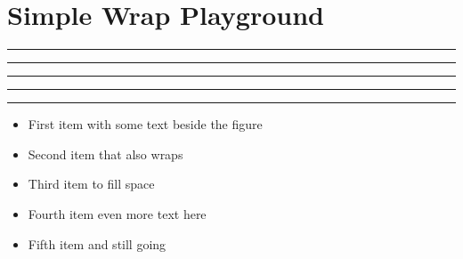 \documentclass[11pt,a4paper]{article}
\begin{document}
\section*{Simple Wrap Playground}

\begin{simplewrap}
  \textcolor{red!30}{\rule{4cm}{5cm}}
\end{simplewrap}
\lipsum[1]\lipsum[2]\lipsum[3]

\vspace{2cm}

\begin{simplewrap}
  \textcolor{blue!20}{\rule{3cm}{9cm}}
\end{simplewrap}
\lipsum[4]\lipsum[5]\lipsum[6]\lipsum[7]\lipsum[8]

\vspace{2cm}

\begin{simplewrap}
  \textcolor{green!30}{\rule{6cm}{3cm}}
\end{simplewrap}
\lipsum[9]\lipsum[10]

\vspace{2cm}

\lipsum[11]
\begin{simplewrap}
  \textcolor{orange!30}{\rule{4cm}{5cm}}
\end{simplewrap}
\lipsum[12]\lipsum[13]\lipsum[14]\lipsum[15]

\vspace{2cm}

\begin{simplewrap}
  \textcolor{purple!20}{\rule{4cm}{4cm}}
\end{simplewrap}
\begin{itemize}
  \item First item with some text beside the figure
  \item Second item that also wraps
  \item Third item to fill space
  \item Fourth item even more text here
  \item Fifth item and still going
\end{itemize}
\end{document}
